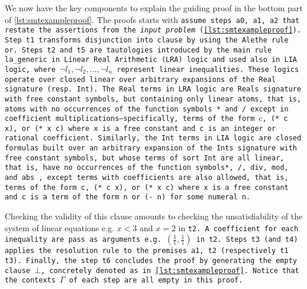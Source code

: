 We now have the key components to explain the guiding proof in the bottom part of \cref{lst:smtexampleproof}.
The proofs starts with \tt{assume} steps \tt{a0}, \tt{a1}, \tt{a2} that restate the assertions from the \textit{input problem} (\cref{lst:smtexampleproof}).
Step \tt{t1} transforms disjunction into clause by using the Alethe rule \tt{or}.
Steps \tt{t2} and \tt{t5} are tautologies introduced by the main rule \tt{la\_generic}
in Linear Real Arithmetic (LRA) logic and used also in LIA logic, where \colorbox{green!30}{$\neg l_1, \neg l_2,\dots, \neg l_n$} represent linear inequalities. These logics operate over
closed linear over arbitrary expansions of the \lstinline[language=SMT]{Real} signature (resp. \lstinline[language=SMT]{Int}).
The \lstinline[language=SMT]{Real} terms in \tt{LRA} logic are Reals signature with free constant symbols, but containing only linear atoms, that is, 
atoms with no occurrences of the function symbols \lstinline[language=SMT]{*} and \lstinline[language=SMT]{/} except in coefficient multiplications—specifically, terms of the form 
$c$, \lstinline[language=SMT]{(* c x)}, or \lstinline[language=SMT]{(* x c)}  where \tt{x} is a free constant and  \tt{c} is an integer or rational coefficient.
Similarly, the \lstinline[language=SMT]{Int} terms in \tt{LIA} logic are closed formulas built over an arbitrary expansion of the
Ints signature with free constant symbols, but whose terms of sort Int  are all linear, that is, have no occurrences of the function symbols\lstinline[language=SMT]{*}, \lstinline[language=SMT]{/}, \lstinline[language=SMT]{div}, \lstinline[language=SMT]{mod}, and \lstinline[language=SMT]{abs}
, except terms with coefficients are also allowed, that is, terms of the form \tt{c}, \lstinline[language=SMT]{(* c x)}, or \lstinline[language=SMT]{(* x c)}
where \tt{x} is a free constant and \tt{c} is a term of the form \lstinline[language=SMT]{n} or \lstinline[language=SMT]{(- n)} for some numeral \tt{n}.


Checking the validity of this clause amounts to checking the unsatisfiability of the system of linear equations e.g. $x < 3$ and $x = 2$ in \tt{t2}.
A coefficient for each inequality are pass as arguments e.g. $(\frac{1}{1},\frac{1}{1})$ in \tt{t2}.
Steps \tt{t3} (and \tt{t4}) applies the \colorbox{purple!30}{\texttt{resolution}} rule to the premises \tt{a1}, \tt{t2} (respectively \tt{t1} \tt{t3}).
Finally, the step \texttt{t6} concludes the proof by generating the empty clause $\bot$, concretely denoted as  in \cref{lst:smtexampleproof}.
Notice that the contexts \colorbox{blue!30}{$\Gamma$} of each step are all empty in this proof.

